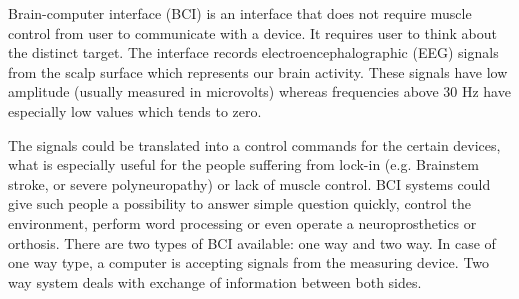 \documentclass[12pt]{article}
\begin{document}
Brain-computer interface (BCI) is an interface that does not require muscle control from user to communicate with a device. It requires user to think about the distinct target. The interface records electroencephalographic (EEG) signals from the scalp surface which represents our brain activity. These signals have low amplitude (usually measured in microvolts) whereas frequencies above 30 Hz have especially low values which tends to zero.\cite{bci_vidal}

The signals could be translated into a control commands for the certain devices, what is especially useful for the people suffering from lock-in (e.g. Brainstem stroke, or severe polyneuropathy) or lack of muscle control.  BCI systems could give such people a possibility to answer simple question quickly, control the environment, perform word processing or even operate a neuroprosthetics or orthosis.
There are two types of BCI available: one way and two way. In case of one way type, a computer is accepting signals from the measuring device. Two way system deals with exchange of information between both sides.\cite{bci_shivangi}
\end{document}
